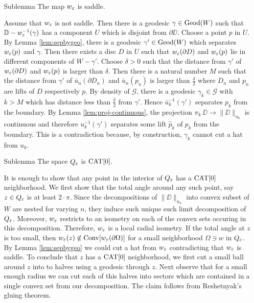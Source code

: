 \documentclass[a4paper,10pt]{amsart}
\begin{document}
\begin{thm}{Sublemma}
 The map $w_\varepsilon$ is saddle.
\end{thm}

Assume that $w_\varepsilon$ is not saddle. Then there is a geodesic $\gamma\in\mathop{\rm Geod}\nolimits(W)$ such that $\mathbb{D}-w_\varepsilon^{-1}(\gamma)$
has a component $U$ which is disjoint from $\partial \DD$. Choose a point $p$ in $U$. By Lemma \ref{lem:sepbygeo}, there is  
a geodesic $\gamma'\in\mathop{\rm Geod}\nolimits(W)$ which separates $w_\varepsilon(p)$ and $\gamma$.
Then there exists a disc $D$ in $U$ such that
$w_\varepsilon(\partial D)$ and $w_\varepsilon(p)$ lie in different components of $W-\gamma'$. Choose $\delta>0$ 
such that the distance from $\gamma'$ of $w_\varepsilon(\partial D)$ and $w_\varepsilon(p)$ is larger than $\delta$.
Then there is a natural number $M$ such that the distance from $\gamma'$ of $\bar u_n(\partial D_n)$ and $\bar u_n(p_n)$ is larger than $\frac{\delta}{2}$
where $D_n$ and $p_n$ are lifts of $D$ respectively $p$.
By density of $\mathcal{G}$, there is a geodesic $\gamma_k\in \mathcal{G}$ with $k>M$ which has distance less than $\frac{\delta}{2}$ from $\gamma'$. 
Hence $\bar u_k^{-1}(\gamma')$ separates $p_k$ from the boundary. By Lemma \ref{lem:proj-continuous}, the projection $\pi_k\:\DD\to \|\DD\|_{u_k}$ is continuous
and therefore $u_k^{-1}(\gamma')$ separates some lift $\hat p_k$ of $p_k$ from the boundary.
This is a contradiction because, by construction, $\gamma_k$ cannot cut a hat from $u_k$.
\qeds

\begin{thm}{Sublemma}
The space $Q_\varepsilon$ is $\mathop{\rm CAT}\nolimits[0]$. 
\end{thm}

It is enough to show that any point in the interior of $Q_\varepsilon$ has a $\mathop{\rm CAT}\nolimits[0]$ neighborhood.
We first show that the total angle around any such point, say $z\in Q_\varepsilon$ is at least $2\cdot\pi$.
Since the decompositions of $\|\DD\|_{u_n}$ into convex subset of $W$ are nested for varying $n$, they
induce such unique such limit decomposition of $Q_\varepsilon$. Moreover, $w_\varepsilon$ restricts to an isometry on each 
of the convex sets occuring in this decomposition. Therefore, $w_\varepsilon$ is a local radial isometry.
If the total angle at $z$ is too small, then $w_\varepsilon(z)\notin\mathop{\rm Conv}\nolimits [w_\varepsilon (\partial\Omega)]$
for a small neighborhood $\Omega\ni w$ in $Q_\varepsilon$. By Lemma \ref{lem:sepbygeo} we could cut a hat from $w_\varepsilon$
contradicting that $w_\varepsilon$ is saddle.
To conclude that $z$ has a $\mathop{\rm CAT}\nolimits[0]$ neighborhood, we first cut a small ball around $z$ into to halves using a geodesic through $z$.
Next observe that for a small enough radius we can cut each of this halves into sectors which are contained in a single convex set
from our decomposition. The claim follows from Reshetnyak's gluing theorem.
\qeds
\end{document}
